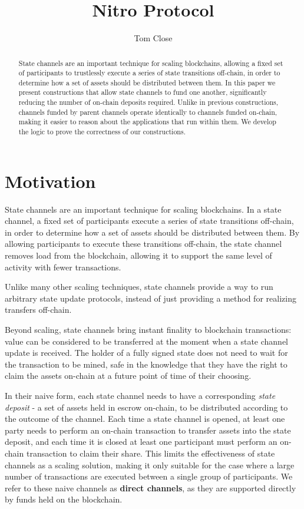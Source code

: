 \documentclass{article}
\title{Nitro Protocol}
\author{Tom Close}
\begin{document}
\maketitle
\begin{abstract}
  State channels are an important technique for scaling blockchains, allowing a fixed set of participants to trustlessly execute a series of state transitions off-chain, in order to determine how a set of assets should be distributed between them.
  In this paper we present constructions that allow state channels to fund one another, significantly reducing the number of on-chain deposits required.
  Unlike in previous constructions, channels funded by parent channels operate identically to channels funded on-chain, making it easier to reason about the applications that run within them.
  We develop the logic to prove the correctness of our constructions.
\end{abstract}

\section{Motivation}

State channels are an important technique for scaling blockchains.
In a state channel, a fixed set of participants execute a series of state transitions off-chain, in order to determine how a set of assets should be distributed between them.
By allowing participants to execute these transitions off-chain, the state channel removes load from the blockchain, allowing it to support the same level of activity with fewer transactions.

Unlike many other scaling techniques, state channels provide a way to run arbitrary state update protocols, instead of just providing a method for realizing transfers off-chain.

Beyond scaling, state channels bring instant finality to blockchain transactions:
value can be considered to be transferred at the moment when a state channel update is received.
The holder of a fully signed state does not need to wait for the transaction to be mined, safe in the knowledge
that they have the right to claim the assets on-chain at a future point of time of their choosing.

In their naive form, each state channel needs to have a corresponding \textit{state deposit} - a set of assets held in escrow on-chain, to be distributed according to the outcome of the channel.
Each time a state channel is opened, at least one party needs to perform an on-chain transaction to transfer assets into the state deposit, and each time it is closed at least one participant must perform an on-chain transaction to claim their share.
This limits the effectiveness of state channels as a scaling solution, making it only suitable for the case where a large number of transactions are executed between a single group of participants.
We refer to these naive channels as \textbf{direct channels}, as they are supported directly by funds held on the blockchain.
\end{document}
